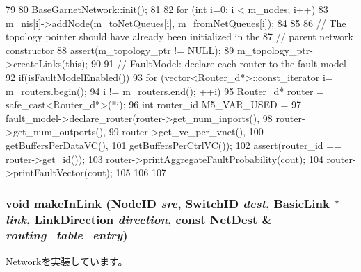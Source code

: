 \begin{DoxyCode}
79 {
80     BaseGarnetNetwork::init();
81 
82     for (int i=0; i < m_nodes; i++) {
83         m_nis[i]->addNode(m_toNetQueues[i], m_fromNetQueues[i]);
84     }
85 
86     // The topology pointer should have already been initialized in the
87     // parent network constructor
88     assert(m_topology_ptr != NULL);
89     m_topology_ptr->createLinks(this);
90 
91     // FaultModel: declare each router to the fault model
92     if(isFaultModelEnabled()){
93         for (vector<Router_d*>::const_iterator i= m_routers.begin();
94              i != m_routers.end(); ++i) {
95             Router_d* router = safe_cast<Router_d*>(*i);
96             int router_id M5_VAR_USED =
97                 fault_model->declare_router(router->get_num_inports(),
98                                             router->get_num_outports(),
99                                             router->get_vc_per_vnet(),
100                                             getBuffersPerDataVC(),
101                                             getBuffersPerCtrlVC());
102             assert(router_id == router->get_id());
103             router->printAggregateFaultProbability(cout);
104             router->printFaultVector(cout);
105         }
106     }
107 }
\end{DoxyCode}
\hypertarget{classGarnetNetwork__d_ac4cf8ff50e877f26606c24880c73fb9d}{
\subsubsection[{makeInLink}]{\setlength{\rightskip}{0pt plus 5cm}void makeInLink ({\bf NodeID} {\em src}, \/  {\bf SwitchID} {\em dest}, \/  {\bf BasicLink} $\ast$ {\em link}, \/  LinkDirection {\em direction}, \/  const {\bf NetDest} \& {\em routing\_\-table\_\-entry})}}
\label{classGarnetNetwork__d_ac4cf8ff50e877f26606c24880c73fb9d}


\hyperlink{classNetwork_a989337badc16737935316d1faa84a017}{Network}を実装しています。


